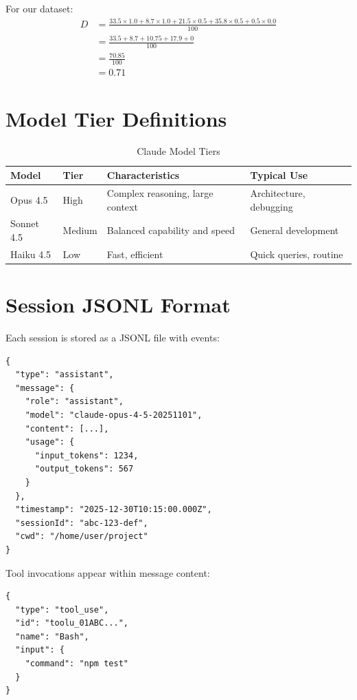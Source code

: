 \documentclass{ntlabs-preprint}
\begin{document}
For our dataset:
\begin{align}
D &= \frac{33.5 \times 1.0 + 8.7 \times 1.0 + 21.5 \times 0.5 + 35.8 \times 0.5 + 0.5 \times 0.0}{100} \\
&= \frac{33.5 + 8.7 + 10.75 + 17.9 + 0}{100} \\
&= \frac{70.85}{100} \\
&= 0.71
\end{align}

\section{Model Tier Definitions}

\begin{table}[h]
\centering
\caption{Claude Model Tiers}
\begin{tabular}{llll}
\toprule
\textbf{Model} & \textbf{Tier} & \textbf{Characteristics} & \textbf{Typical Use} \\
\midrule
Opus 4.5 & High & Complex reasoning, large context & Architecture, debugging \\
Sonnet 4.5 & Medium & Balanced capability and speed & General development \\
Haiku 4.5 & Low & Fast, efficient & Quick queries, routine \\
\bottomrule
\end{tabular}
\end{table}

\section{Session JSONL Format}

Each session is stored as a JSONL file with events:

\begin{lstlisting}[caption={Sample JSONL event}]
{
  "type": "assistant",
  "message": {
    "role": "assistant",
    "model": "claude-opus-4-5-20251101",
    "content": [...],
    "usage": {
      "input_tokens": 1234,
      "output_tokens": 567
    }
  },
  "timestamp": "2025-12-30T10:15:00.000Z",
  "sessionId": "abc-123-def",
  "cwd": "/home/user/project"
}
\end{lstlisting}

Tool invocations appear within message content:

\begin{lstlisting}[caption={Tool use structure}]
{
  "type": "tool_use",
  "id": "toolu_01ABC...",
  "name": "Bash",
  "input": {
    "command": "npm test"
  }
}
\end{lstlisting}
\end{document}
